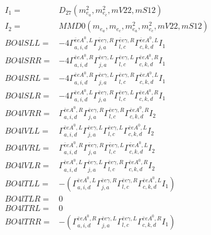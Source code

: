\documentclass[A4,landscape]{article}
\begin{document}
\begin{align} 
I_1 = & D_{27}(m^2_{e_{{a}}}, m^2_{e_{{c}}}, mV22, mS12) \\ 
I_2 = & MMD0(m_{e_{{a}}}, m_{e_{{c}}}, m^2_{e_{{a}}}, m^2_{e_{{c}}}, mV22, mS12) \\ 
  BO4lSLL= & -4  \Gamma^{\bar{e}e A^0 ,L}_{a, i, d} \Gamma^{\bar{e}e \gamma ,R}_{j, a} \Gamma^{\bar{e}e \gamma ,R}_{l, c} \Gamma^{\bar{e}e A^0 ,L}_{c, k, d} I_1 \\ 
  BO4lSRR= & -4  \Gamma^{\bar{e}e A^0 ,R}_{a, i, d} \Gamma^{\bar{e}e \gamma ,L}_{j, a} \Gamma^{\bar{e}e \gamma ,L}_{l, c} \Gamma^{\bar{e}e A^0 ,R}_{c, k, d} I_1 \\ 
  BO4lSRL= & -4  \Gamma^{\bar{e}e A^0 ,R}_{a, i, d} \Gamma^{\bar{e}e \gamma ,L}_{j, a} \Gamma^{\bar{e}e \gamma ,R}_{l, c} \Gamma^{\bar{e}e A^0 ,L}_{c, k, d} I_1 \\ 
  BO4lSLR= & -4  \Gamma^{\bar{e}e A^0 ,L}_{a, i, d} \Gamma^{\bar{e}e \gamma ,R}_{j, a} \Gamma^{\bar{e}e \gamma ,L}_{l, c} \Gamma^{\bar{e}e A^0 ,R}_{c, k, d} I_1 \\ 
  BO4lVRR= &  \Gamma^{\bar{e}e A^0 ,R}_{a, i, d} \Gamma^{\bar{e}e \gamma ,R}_{j, a} \Gamma^{\bar{e}e \gamma ,R}_{l, c} \Gamma^{\bar{e}e A^0 ,R}_{c, k, d} I_2 \\ 
  BO4lVLL= &  \Gamma^{\bar{e}e A^0 ,L}_{a, i, d} \Gamma^{\bar{e}e \gamma ,L}_{j, a} \Gamma^{\bar{e}e \gamma ,L}_{l, c} \Gamma^{\bar{e}e A^0 ,L}_{c, k, d} I_2 \\ 
  BO4lVRL= &  \Gamma^{\bar{e}e A^0 ,R}_{a, i, d} \Gamma^{\bar{e}e \gamma ,R}_{j, a} \Gamma^{\bar{e}e \gamma ,L}_{l, c} \Gamma^{\bar{e}e A^0 ,L}_{c, k, d} I_2 \\ 
  BO4lVLR= &  \Gamma^{\bar{e}e A^0 ,L}_{a, i, d} \Gamma^{\bar{e}e \gamma ,L}_{j, a} \Gamma^{\bar{e}e \gamma ,R}_{l, c} \Gamma^{\bar{e}e A^0 ,R}_{c, k, d} I_2 \\ 
  BO4lTLL= & -( \Gamma^{\bar{e}e A^0 ,L}_{a, i, d} \Gamma^{\bar{e}e \gamma ,R}_{j, a} \Gamma^{\bar{e}e \gamma ,R}_{l, c} \Gamma^{\bar{e}e A^0 ,L}_{c, k, d} I_1) \\ 
  BO4lTLR= & 0 \\ 
  BO4lTRL= & 0 \\ 
  BO4lTRR= & -( \Gamma^{\bar{e}e A^0 ,R}_{a, i, d} \Gamma^{\bar{e}e \gamma ,L}_{j, a} \Gamma^{\bar{e}e \gamma ,L}_{l, c} \Gamma^{\bar{e}e A^0 ,R}_{c, k, d} I_1) \\ 
\end{align} 
\end{document}
